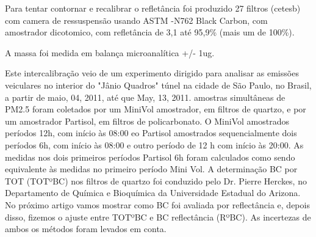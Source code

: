 Para tentar contornar e recalibrar o refletância foi produzido 27 filtros (cetesb) com camera de ressuspensão
usando ASTM -N762 Black Carbon, com amostrador dicotomico, com refletância de 3,1 até 95,9\% (mais um de 100\%).

A massa foi medida em balança microanalítica +/- 1ug.




Este intercalibração veio de um experimento dirigido para analisar as emissões veiculares no interior do "Jânio Quadros" túnel na cidade de São Paulo, no Brasil, a partir de maio, 04, 2011, até que May, 13, 2011. amostras simultâneas de PM2.5 foram coletados por um MiniVol amostrador, em filtros de quartzo, e por um amostrador Partisol, em filtros de policarbonato. O MiniVol amostrados períodos 12h, com início às 08:00 eo Partisol amostrados sequencialmente dois períodos 6h, com início às 08:00 e outro período de 12 h com início às 20:00. As medidas nos dois primeiros períodos Partisol 6h foram calculados como sendo equivalente às medidas no primeiro período Mini Vol.
A determinação BC por TOT (TOTºBC) nos filtros de quartzo foi conduzido pelo Dr. Pierre Herckes, no Departamento de Química e Bioquímica da Universidade Estadual do Arizona. No próximo artigo vamos mostrar como BC foi avaliada por reflectância e, depois disso, fizemos o ajuste entre TOTºBC e BC reflectância (RºBC). As incertezas de ambos os métodos foram levados em conta.





